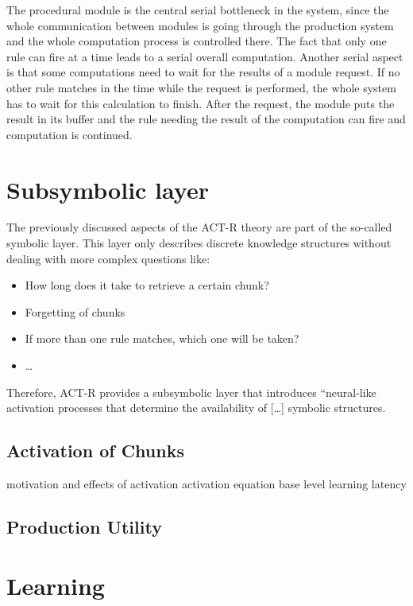 The procedural module is the central serial bottleneck in the system, since the whole communication between modules is going through the production system and the whole computation process is controlled there. The fact that only one rule can fire at a time leads to a serial overall computation. Another serial aspect is that some computations need to wait for the results of a module request. If no other rule matches in the time while the request is performed, the whole system has to wait for this calculation to finish. After the request, the module puts the result in its buffer and the rule needing the result of the computation can fire and computation is continued.

\section{Subsymbolic layer}

The previously discussed aspects of the ACT-R theory are part of the so-called symbolic layer. This layer only describes discrete knowledge structures without dealing with more complex questions like: 

\begin{itemize}
\item How long does it take to retrieve a certain chunk? 
\item Forgetting of chunks
\item If more than one rule matches, which one will be taken?
\item \dots
\end{itemize}

Therefore, ACT-R provides a subsymbolic layer that introduces ``neural-like activation processes that determine the availability of [\dots] symbolic structures.

\subsection{Activation of Chunks}

motivation and effects of activation
activation equation
base level learning
latency

\subsection{Production Utility}



\section{Learning}

